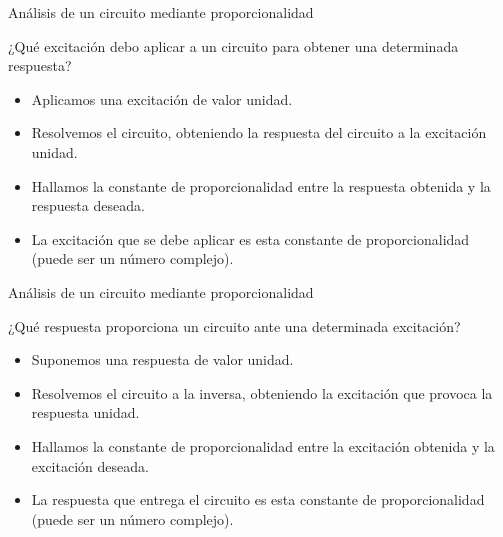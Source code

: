 \documentclass[xcolor={usenames,svgnames,dvipsnames}]{beamer}
\begin{document}
\begin{frame}[label={sec:orgde54511}]{Análisis de un circuito mediante proporcionalidad}
\begin{block}{¿Qué excitación debo aplicar a un circuito para obtener una determinada respuesta?}
\begin{itemize}
\item Aplicamos una excitación de valor unidad.
\item Resolvemos el circuito, obteniendo la respuesta del circuito a la excitación unidad.
\item Hallamos la constante de proporcionalidad entre la respuesta obtenida y la respuesta deseada.
\item La excitación que se debe aplicar es esta constante de proporcionalidad (puede ser un número complejo).
\end{itemize}
\end{block}
\end{frame}

\begin{frame}[label={sec:org534c23f}]{Análisis de un circuito mediante proporcionalidad}
\begin{block}{¿Qué respuesta proporciona un circuito ante una determinada excitación?}
\begin{itemize}
\item Suponemos una respuesta de valor unidad.
\item Resolvemos el circuito a la inversa, obteniendo la excitación que provoca la respuesta unidad.
\item Hallamos la constante de proporcionalidad entre la excitación obtenida y la excitación deseada.
\item La respuesta que entrega el circuito es esta constante de proporcionalidad (puede ser un número complejo).
\end{itemize}
\end{block}
\end{frame}
\end{document}
